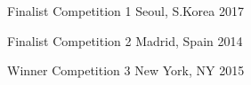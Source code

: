 



\begin{cvhonors}

  \cvhonor
    {Finalist} %
    {Competition 1} %
    {Seoul, S.Korea} %
    {2017} %

  \cvhonor
    {Finalist} %
    {Competition 2} %
    {Madrid, Spain} %
    {2014} %


\end{cvhonors}




\begin{cvhonors}

  \cvhonor
    {Winner} %
    {Competition 3} %
    {New York, NY} %
    {2015} %

\end{cvhonors}
